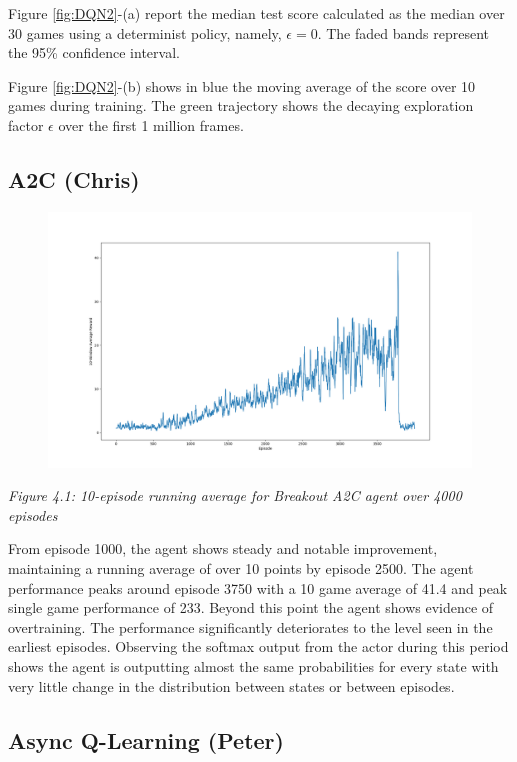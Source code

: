 \documentclass{article}
\begin{document}
Figure \ref{fig:DQN2}-(a) report the median test score calculated as the median over 30 games using a determinist policy, namely, $\epsilon = 0$. The faded bands represent the 95\% confidence interval.

Figure \ref{fig:DQN2}-(b) shows in blue the moving average of the score over 10 games during training. The green trajectory shows the decaying exploration factor $\epsilon$ over the first 1 million frames. 


\subsection{A2C (Chris)}

\begin{figure}[h]
\includegraphics[scale=0.2]{A2C4000.png}
\end{figure}
\emph{Figure 4.1: 10-episode running average for Breakout A2C agent over 4000 episodes}

From episode 1000, the agent shows steady and notable improvement, maintaining a running average of over 10 points by episode 2500. The agent performance peaks around episode 3750 with a 10 game average of 41.4 and peak single game performance of 233. Beyond this point the agent shows evidence of overtraining. The performance significantly deteriorates to the level seen in the earliest episodes. Observing the softmax output from the actor during this period shows the agent is outputting almost the same probabilities for every state with very little change in the distribution between states or between episodes.

\subsection{Async Q-Learning (Peter)}
\end{document}
